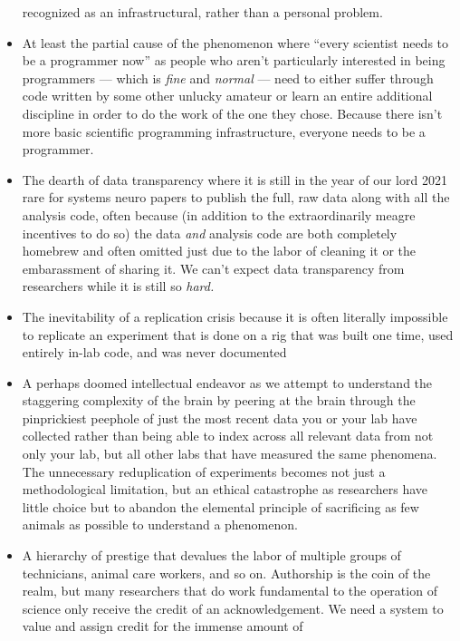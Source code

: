 \documentclass[nohyper]{tufte-book-jls}
\begin{document}
\begin{itemize}
  recognized as an infrastructural, rather than a personal problem.
\item
  At least the partial cause of the phenomenon where ``every scientist
  needs to be a programmer now'' as people who aren't particularly
  interested in being programmers --- which is \emph{fine} and
  \emph{normal} --- need to either suffer through code written by some
  other unlucky amateur or learn an entire additional discipline in
  order to do the work of the one they chose. Because there isn't more
  basic scientific programming infrastructure, everyone needs to be a
  programmer.
\item
  The dearth of data transparency where it is still in the year of our
  lord 2021 rare for systems neuro papers to publish the full, raw data
  along with all the analysis code, often because (in addition to the
  extraordinarily meagre incentives to do so) the data \emph{and}
  analysis code are both completely homebrew and often omitted just due
  to the labor of cleaning it or the embarassment of sharing
  it. We can't
  expect data transparency from researchers while it is still so
  \emph{hard.}
\item
  The inevitability of a replication crisis because it is often
  literally impossible to replicate an experiment that is done on a rig
  that was built one time, used entirely in-lab code, and was never
  documented
\item
  A perhaps doomed intellectual endeavor as we attempt to understand the staggering
  complexity of the brain by peering at the brain through the
  pinprickiest peephole of just the most recent data you or your lab
  have collected rather than being able to index across all relevant
  data from not only your lab, but all other labs that have measured the
  same phenomena. The unnecessary reduplication of experiments becomes
  not just a methodological limitation, but an ethical catastrophe as
  researchers have little choice but to abandon the elemental principle
  of sacrificing as few animals as possible to understand a phenomenon.
\item
  A hierarchy of prestige that devalues the labor of multiple groups of
  technicians, animal care workers, and so on. Authorship is the coin of
  the realm, but many researchers that do work fundamental to the
  operation of science only receive the credit of an acknowledgement. We
  need a system to value and assign credit for the immense amount of

\end{itemize}
\end{document}
